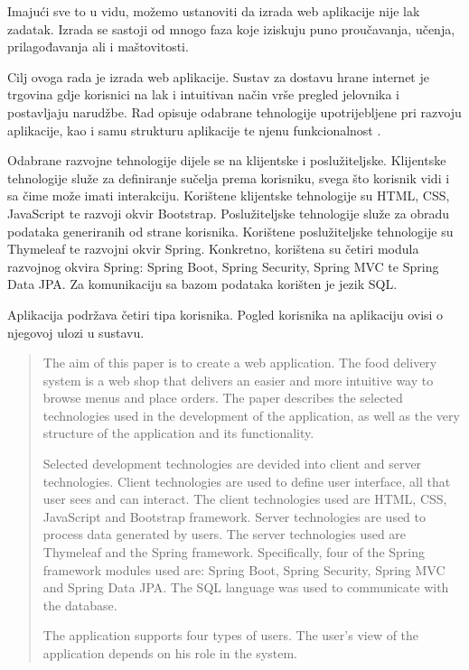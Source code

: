 \documentclass[times, utf8, zavrsni, numeric]{fer}
\begin{document}
Imajući sve to u vidu, možemo ustanoviti da izrada web aplikacije nije lak zadatak. Izrada se sastoji od mnogo faza koje iziskuju puno proučavanja, učenja, prilagođavanja ali i maštovitosti.




\begin{sazetak}
Cilj ovoga rada je izrada web aplikacije. Sustav za dostavu hrane internet je trgovina gdje korisnici na lak i intuitivan način vrše pregled jelovnika i postavljaju narudžbe.  Rad opisuje odabrane tehnologije upotrijebljene pri razvoju aplikacije, kao i samu strukturu aplikacije te njenu funkcionalnost .

Odabrane razvojne tehnologije dijele se na klijentske i poslužiteljske. Klijentske tehnologije služe za definiranje sučelja prema korisniku, svega što korisnik vidi i sa čime može imati interakciju. Korištene klijentske tehnologije su HTML, CSS, JavaScript te razvoji okvir Bootstrap. Poslužiteljske tehnologije služe za obradu podataka generiranih od strane korisnika. Korištene poslužiteljske tehnologije su Thymeleaf te razvojni okvir Spring. Konkretno, korištena su četiri modula razvojnog okvira Spring: Spring Boot, Spring Security, Spring MVC te Spring Data JPA. Za komunikaciju sa bazom podataka korišten je jezik SQL.

Aplikacija podržava četiri tipa korisnika. Pogled korisnika na aplikaciju ovisi o njegovoj ulozi u sustavu.


\end{sazetak}

\begin{abstract}
The aim of this paper is to create a web application. The food delivery system is a web shop that delivers an easier and more intuitive way to browse menus and place orders. The paper describes the selected technologies used in the development of the application, as well as the very structure of the application and its functionality.

Selected development technologies are devided into client and server technologies. Client technologies are used to define user interface, all that user sees and can interact. The client technologies used are HTML, CSS, JavaScript and Bootstrap framework. Server technologies are used to process data generated by users. The server technologies used are Thymeleaf and the Spring framework. Specifically, four of the Spring framework modules used are: Spring Boot, Spring Security, Spring MVC and Spring Data JPA. The SQL language was used to communicate with the database.

The application supports four types of users. The user's view of the application depends on his role in the system.

\end{abstract}
\end{document}
